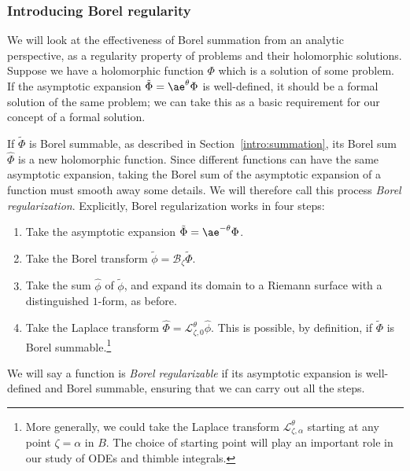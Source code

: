 \documentclass{article}
\newcommand{\series}[1]{\tilde{#1}}
\newcommand{\laplace}{\mathcal{L}}
\newcommand{\borel}{\mathcal{B}}
\newcommand{\aexp}{\mathrm{\ae}}
\theoremstyle{definition}
\theoremstyle{plain}
\begin{document}
\subsubsection{Introducing Borel regularity}
%
We will look at the effectiveness of Borel summation from an analytic perspective, as a regularity property of problems and their holomorphic solutions. Suppose we have a holomorphic function $\Phi$ which is a solution of some problem. If the asymptotic expansion $\series{\Phi} = \ae^\theta \Phi$ is well-defined, it should be a formal solution of the same problem; we can take this as a basic requirement for our concept of a formal solution.
\begin{center}
\end{center}
If $\series{\Phi}$ is Borel summable, as described in Section~\ref{intro:summation}, its Borel sum $\hat{\Phi}$ is a new holomorphic function.
Since different functions can have the same asymptotic expansion, taking the Borel sum of the asymptotic expansion of a function must smooth away some details. We will therefore call this process {\em Borel regularization}. Explicitly, Borel regularization works in four steps:
\begin{enumerate}
\item Take the asymptotic expansion $\series{\Phi} = \aexp^{-\theta} \Phi$.
\item Take the Borel transform $\series{\phi} = \borel_\zeta \series{\Phi}$.
\item Take the sum $\hat{\phi}$ of $\series{\phi}$, and expand its domain to a Riemann surface with a distinguished $1$-form, as before.
\item Take the Laplace transform $\hat{\Phi} = \laplace_{\zeta, 0}^\theta \hat{\phi}$. This is possible, by definition, if $\series{\Phi}$ is Borel summable.\footnote{More generally, we could take the Laplace transform $\laplace^\theta_{\zeta, \alpha}$ starting at any point $\zeta = \alpha$ in $B$. The choice of starting point will play an important role in our study of ODEs and thimble integrals.}
\end{enumerate}
We will say a function is {\em Borel regularizable} if its asymptotic expansion is well-defined and Borel summable, ensuring that we can carry out all the steps.
\end{document}
